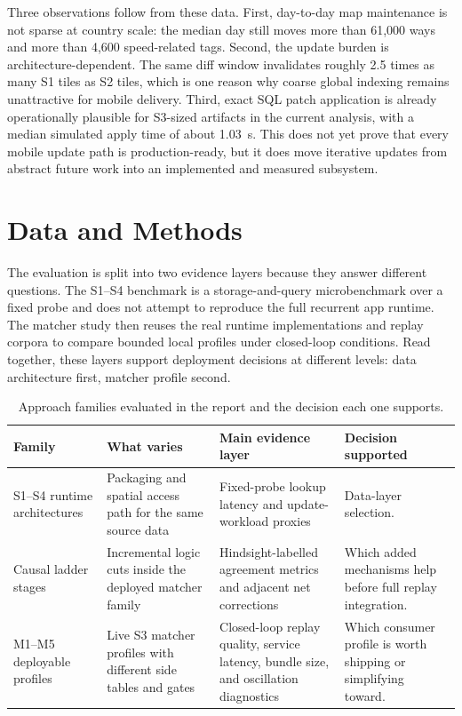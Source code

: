 \documentclass{article}
\begin{document}
Three observations follow from these data. First, day-to-day map maintenance is not sparse at country scale: the median day still moves more than 61{,}000 ways and more than 4{,}600 speed-related tags. Second, the update burden is architecture-dependent. The same diff window invalidates roughly 2.5 times as many S1 tiles as S2 tiles, which is one reason why coarse global indexing remains unattractive for mobile delivery. Third, exact SQL patch application is already operationally plausible for S3-sized artifacts in the current analysis, with a median simulated apply time of about \SI{1.03}{s}. This does not yet prove that every mobile update path is production-ready, but it does move iterative updates from abstract future work into an implemented and measured subsystem.

\section{Data and Methods}
The evaluation is split into two evidence layers because they answer different questions. The S1--S4 benchmark is a storage-and-query microbenchmark over a fixed probe and does not attempt to reproduce the full recurrent app runtime. The matcher study then reuses the real runtime implementations and replay corpora to compare bounded local profiles under closed-loop conditions. Read together, these layers support deployment decisions at different levels: data architecture first, matcher profile second.

\begin{table}[!htbp]
\centering
\scriptsize
\caption{Approach families evaluated in the report and the decision each one supports.}
\label{tab:approach_families}
\begin{tabular}{p{2.6cm}p{3.6cm}p{3.3cm}p{2.4cm}}
\toprule
Family & What varies & Main evidence layer & Decision supported \\
\midrule
S1--S4 runtime architectures & Packaging and spatial access path for the same source data & Fixed-probe lookup latency and update-workload proxies & Data-layer selection. \\
Causal ladder stages & Incremental logic cuts inside the deployed matcher family & Hindsight-labelled agreement metrics and adjacent net corrections & Which added mechanisms help before full replay integration. \\
M1--M5 deployable profiles & Live S3 matcher profiles with different side tables and gates & Closed-loop replay quality, service latency, bundle size, and oscillation diagnostics & Which consumer profile is worth shipping or simplifying toward. \\
\bottomrule
\end{tabular}
\end{table}
\end{document}
